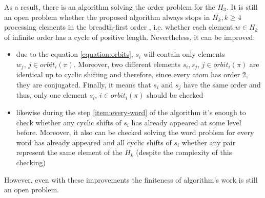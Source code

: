 \documentclass[a4paper,12pt]{amsart}
\begin{document}
As a result, there is an algorithm solving the order problem for the $H_3$. It is still an open problem whether the proposed algorithm always stops in $H_k, k \ge 4$ processing elements in the breadth-first order , i.e. whether each element $w \in H_k$ of infinite order has a cycle of positive length. Nevertheless, it can be improved: 

\begin{itemize}
	\item due to the equation \ref{equation:orbits}, $s_i$ will contain only elements $w_j, \, j \in orbit_i(\pi)$. Moreover, two different elements $s_i, s_j, \, j \in orbit_i(\pi)$ are identical up to cyclic shifting and therefore, since every atom has order 2, they are conjugated. Finally, it means that $s_i$ and $s_j$ have the same order and thus, only one element $s_i$, $i \in orbit_i(\pi)$ should be checked
	
	\item likewise during the step \ref{item:every-word} of the algorithm it's enough to check whether any cyclic shifts of $s_i$ has already appeared at some level before. Moreover, it also can be checked solving the word problem for every word has already appeared and all cyclic shifts of $s_i$ whether any pair represent the same element of the $H_k$ (despite the complexity of this checking)
\end{itemize}

However, even with these improvements the finiteness of algorithm's work is still an open problem. 
\end{document}
